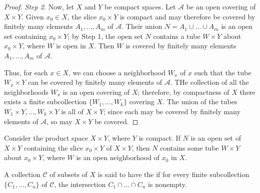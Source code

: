 \documentclass[12pt, a4paper, oneside, openright, titlepage]{book}
\begin{document}
\begin{proof}
    \emph{Step 2.} Now, let $X$ and $Y$ be compact spaces. Let $\mathcal{A}$ be an open covering of $X\times Y$. Given $x_0 \in X$, the slice $x_0 \times Y$ is compact and may therefore be covered by finitely many elements $A_1,...,A_m$ of $\mathcal{A}$. Their union $N = A_1 \cup ... \cup A_m$ is an open set containing $x_0 \times Y$; by Step 1, the open set $N$ contains a tube $W\times Y$ about $x_0 \times Y$, where $W$ is open in $X$. Then $W$ is covered by finitely many elements $A_1,...,A_m$ of $\mathcal{A}$. 

    Thus, for each $x \in X$, we can choose a neighborhood $W_x$ of $x$ such that the tube $W_x \times Y$ can be covered by finitely many elements of $\mathcal{A}$. THe collection of all the neighborhoods $W_x$ is an open covering of $X$; therefore, by compactness of $X$ there exists a finite subcollection $\{W_1,...,W_k\}$ covering $X$. The union of the tubes $W_1\times Y,..., W_k\times Y$ is all of $X \times Y$; since each may be covered by finitely many elements of $\mathcal{A}$, so may $X\times Y$ be covered.
\end{proof}

\begin{lemma}
    Consider the product space $X\times Y$, where $Y$ is compact. If $N$ is an open set of $X\times Y$ containing the slice $x_0 \times Y$ of $X\times Y$, then $N$ contains some tube $W\times Y$ about $x_0 \times Y$, where $W$ is an open neighborhood of $x_0$ in $X$.
\end{lemma}

\begin{definition}
    A collection $\mathcal{C}$ of subsets of $X$ is said to have the  if for every finite subcollection $\{C_1,...,C_n\}$ of $\mathcal{C}$, the intersection $C_1\cap ...\cap C_n$ is nonempty.
\end{definition}
\end{document}
